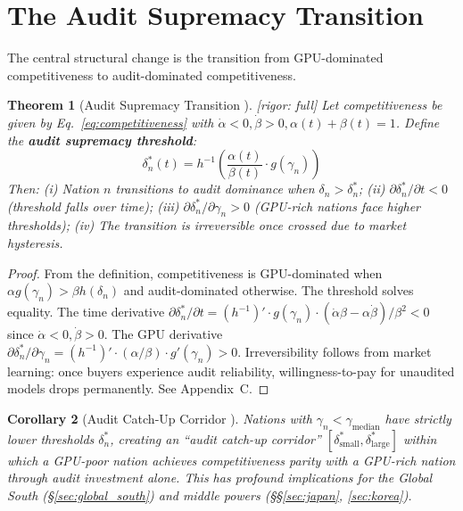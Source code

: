 \documentclass[11pt,a4paper]{article}
\newtheorem{theorem}{Theorem}[section]
\newtheorem{corollary}[theorem]{Corollary}
\theoremstyle{definition}
\theoremstyle{remark}
\newcommand{\rigorFull}{\textcolor{green!60!black}{[rigor: full]}}
\newcommand{\auditDepth}{\delta}
\newcommand{\gpuScale}{\gamma}
\begin{document}
\section{The Audit Supremacy Transition}
\label{sec:transition}
The central structural change is the transition from GPU-dominated competitiveness to audit-dominated competitiveness.
\begin{theorem}[Audit Supremacy Transition ] \label{thm:transition}
\rigorFull
Let competitiveness be given by Eq.~\eqref{eq:competitiveness} with $\dot{\alpha} < 0, \dot{\beta} > 0, \alpha(t) + \beta(t) = 1$. Define the \textbf{audit supremacy threshold}:
\begin{equation}
    \auditDepth^*_n(t) = h^{-1}\left(\frac{\alpha(t)}{\beta(t)} \cdot g(\gpuScale_n)\right)
    \label{eq:threshold}
\end{equation}
Then: (i) Nation $n$ transitions to audit dominance when $\auditDepth_n > \auditDepth^*_n$; (ii) $\partial \auditDepth^*_n / \partial t < 0$ (threshold falls over time); (iii) $\partial \auditDepth^*_n / \partial \gpuScale_n > 0$ (GPU-rich nations face higher thresholds); (iv) The transition is irreversible once crossed due to market hysteresis.
\end{theorem}
\begin{proof}
From the definition, competitiveness is GPU-dominated when $\alpha g(\gpuScale_n) > \beta h(\auditDepth_n)$ and audit-dominated otherwise. The threshold solves equality. The time derivative $\partial \auditDepth^*_n / \partial t = (h^{-1})' \cdot g(\gpuScale_n) \cdot (\dot{\alpha}\beta - \alpha\dot{\beta})/\beta^2 < 0$ since $\dot{\alpha} < 0, \dot{\beta} > 0$. The GPU derivative $\partial \auditDepth^*_n / \partial \gpuScale_n = (h^{-1})' \cdot (\alpha/\beta) \cdot g'(\gpuScale_n) > 0$. Irreversibility follows from market learning: once buyers experience audit reliability, willingness-to-pay for unaudited models drops permanently. See Appendix~C.
\end{proof}
\begin{corollary}[Audit Catch-Up Corridor ]
Nations with $\gpuScale_n < \gpuScale_{\text{median}}$ have strictly lower thresholds $\auditDepth^*_n$, creating an ``audit catch-up corridor'' $[\auditDepth^*_{\text{small}}, \auditDepth^*_{\text{large}}]$ within which a GPU-poor nation achieves competitiveness parity with a GPU-rich nation through audit investment alone. This has profound implications for the Global South (\S\ref{sec:global_south}) and middle powers (\S\S\ref{sec:japan}, \ref{sec:korea}).
\end{corollary}
\end{document}
